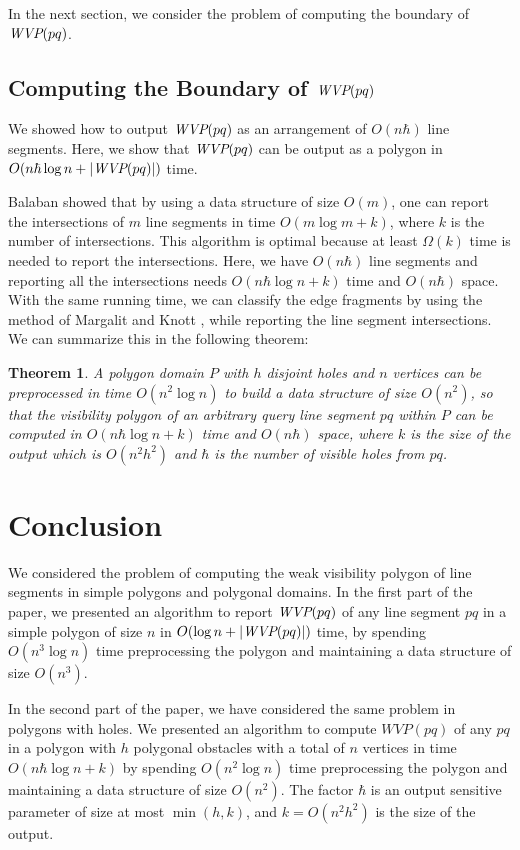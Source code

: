 \documentclass[5p]{elsarticle}
\newtheorem{theorem}{Theorem}
\def\WVP{\mbox{\it{WVP}}}
\def\P{\mbox{${P}$}}
\begin{document}
In the next section, we consider the problem of computing the boundary of $\WVP(pq)$.

\subsection{Computing the Boundary of $\WVP(pq)$}
We showed how to output $\WVP(pq)$ as an arrangement of $O(n\hbar)$ line segments.
Here, we show that $\WVP(pq)$ can be output as a polygon in $O(n\hbar \log n + |\WVP(pq)|)$ time.

Balaban \cite{Bal95} showed that by using a data structure of size $O(m)$, one can report
the intersections of $m$ line segments in time $O(m \log m + k)$, where $k$ is the number
of intersections. This algorithm is optimal because at least $\Omega(k)$ time is needed
to report the intersections.
Here, we have $O(n\hbar)$ line segments and reporting all the intersections
needs $O(n\hbar \log n + k)$ time and $O(n\hbar)$ space.
With the same running time, we can classify the edge fragments by using 
the method of Margalit and Knott \cite{MK89}, while reporting the line segment intersections.
We can summarize this in the following theorem:


\begin{theorem}
A polygon domain $\P$ with $h$ disjoint holes and $n$ vertices can be 
preprocessed in time $O(n^2 \log n)$ to build a data structure of size $O(n^2)$, so that the visibility 
polygon of an arbitrary query line segment $pq$ within $\P$ can be computed in 
$O(n \hbar \log n + k)$ time and $O(n \hbar)$ space, where 
$k$ is the size of the output which is $O(n^2 h^2)$ and $\hbar$ is the number of visible holes from $pq$. 
\end{theorem}



\section{Conclusion}
We considered the problem of computing the weak visibility polygon of line segments
in simple polygons and polygonal domains. In the first part of the paper, we presented an algorithm to 
report $\WVP(pq)$ of any line segment $pq$ in a simple polygon of size $n$ in 
$O(\log n + |\WVP(pq)|)$ time, by spending $O(n^3 \log n)$ time preprocessing the polygon 
and maintaining a data structure of size $O(n^3)$. 

In the second part of the paper, we have considered the same problem in polygons with holes. 
We presented an algorithm to compute $WVP(pq)$ of any $pq$ 
in a polygon with $h$ polygonal obstacles 
with a total of $n$ vertices in time $O(n \hbar \log n + k)$
by spending $O(n^2 \log n)$ time preprocessing the polygon and maintaining a data structure of
size $O(n^2)$. The factor $\hbar$ is an output sensitive parameter of size at most
$\min(h, k)$, and $k = O(n^2 h^2)$ is the size of the output.
\end{document}
